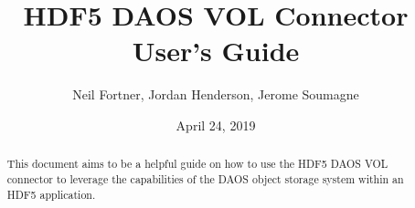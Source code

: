 \documentclass[letterpaper,hyper]{THG_Guide}
\title{HDF5 DAOS VOL Connector User's Guide}
\author{Neil Fortner, Jordan Henderson, Jerome Soumagne}
\date{April 24, 2019}
\begin{document}
\maketitle

\begin{abstract}
This document aims to be a helpful guide on how to use the HDF5 DAOS VOL connector to leverage the capabilities of the DAOS object storage system within an HDF5 application.
\end{abstract}


\makerevisions

\tableofcontents
\newpage


\end{document}
